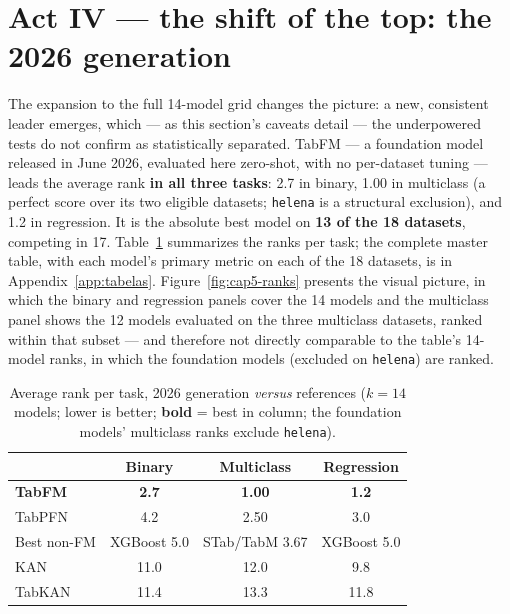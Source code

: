 \section{Act IV --- the shift of the top: the 2026 generation}
\label{sec:cap5-ato4}

The expansion to the full 14-model grid changes the picture: a new,
consistent leader emerges, which --- as this section's caveats
detail --- the underpowered tests do not confirm as statistically
separated. TabFM
--- a foundation model released in June 2026, evaluated here
zero-shot, with no per-dataset tuning --- leads the average rank
\textbf{in all three tasks}: 2.7 in binary, 1.00 in multiclass (a
perfect score over its two eligible datasets; \texttt{helena} is a
structural exclusion), and 1.2 in regression. It is the absolute best
model on \textbf{13 of the 18 datasets}, competing in 17.
Table~\ref{tab:cap5-ranks} summarizes the ranks per task; the
complete master table, with each model's primary metric on each of
the 18 datasets, is in Appendix~\ref{app:tabelas}.
Figure~\ref{fig:cap5-ranks} presents the visual picture, in which the
binary and regression panels cover the 14 models and the multiclass
panel shows the 12 models evaluated on the three multiclass datasets,
ranked within that subset --- and therefore not directly comparable
to the table's 14-model ranks, in which the foundation models
(excluded on \texttt{helena}) are ranked.

\begin{table}[htbp]
\centering
\caption[Average rank per task: the 2026 extension]{Average rank per
task, 2026 generation \emph{versus} references ($k{=}14$ models;
lower is better; \textbf{bold} = best in column; the foundation
models' multiclass ranks exclude \texttt{helena}).}
\label{tab:cap5-ranks}
\begin{tabular}{lccc}
\toprule
 & Binary & Multiclass & Regression \\
\midrule
\textbf{TabFM}      & \textbf{2.7} & \textbf{1.00} & \textbf{1.2} \\
TabPFN              & 4.2          & 2.50          & 3.0 \\
Best non-FM         & XGBoost 5.0  & STab/TabM 3.67 & XGBoost 5.0 \\
KAN                 & 11.0         & 12.0          & 9.8 \\
TabKAN              & 11.4         & 13.3          & 11.8 \\
\bottomrule
\end{tabular}
\end{table}

